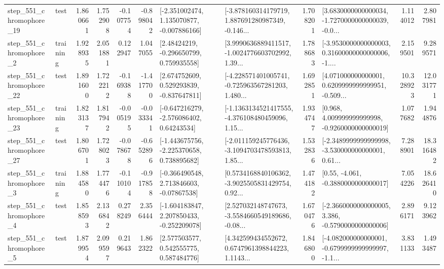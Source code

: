 \begin{tabular}{llrrrrllrlrr}
  step\_551\_chromophore\_19 &      test &      1.860661 &    1.752908 &     -0.107754 & -0.898042 &   [-2.351002474, 1.135070877, -0.007886166] &  [-3.878160314179719, 1.887691280987349, -0.146... &       1.708201 &  [3.6830000000000034, -1.7270000000000039, -0.0... &            1.114012 &          2.807981 \\
   step\_551\_chromophore\_2 &  training &      1.928935 &    2.051881 &      0.122947 &  1.047055 &     [2.48424219, -0.296650799, 0.759935558] &  [3.9990636889411517, -1.0024776603702992, 1.39... &       1.788683 &  [-3.9530000000000003, 0.31600000000000006, -1.... &            2.159501 &          9.289571 \\
  step\_551\_chromophore\_22 &      test &      1.891600 &    1.722212 &     -0.169388 & -1.417700 &    [2.674752609, 0.529293839, -0.837647811] &  [-4.228571401005741, -0.725963567281203, 1.480... &       1.692851 &  [4.071000000000001, 0.6209999999999951, -0.509... &           10.328923 &         12.031771 \\
  step\_551\_chromophore\_23 &  training &      1.823137 &    1.817942 &     -0.005195 & -0.033341 &    [-0.647216279, -2.576086402, 0.64243534] &  [-1.1363134521417555, -4.376108480459096, 1.15... &       1.934747 &    [0.968, 4.009999999999998, -0.9260000000000019] &            1.077682 &          1.944876 \\
  step\_551\_chromophore\_27 &      test &      1.806701 &    1.728023 &     -0.078678 & -0.652896 &   [-1.443675756, -2.225370658, 0.738895682] &  [-2.011159245776436, -3.1094703478593813, 1.85... &       1.532836 &  [-2.3489999999999998, -3.530000000000001, 0.61... &            7.288901 &         18.316482 \\
   step\_551\_chromophore\_3 &  training &      1.884580 &    1.774476 &     -0.110104 & -0.917858 &    [-0.366490548, 2.713846603, -0.07867538] &  [0.5734168840106362, -3.9025505831429754, 0.92... &       1.474182 &                [0.55, -4.061, -0.3880000000000017] &            7.054226 &         18.626410 \\
   step\_551\_chromophore\_4 &      test &      1.858593 &    2.136842 &      0.278249 &  2.356444 &   [-1.604183847, 2.207850433, -0.252209078] &  [2.527032148747673, -3.5584660549189686, -0.08... &       1.670476 &  [-2.3660000000000005, 3.386, -0.5790000000000006] &            2.896171 &          9.123962 \\
   step\_551\_chromophore\_5 &      test &      1.879954 &    2.099597 &      0.219643 &  1.862322 &     [2.577503577, 0.542555775, 0.587484776] &  [4.342599434552672, 0.6747961398844223, 1.1143... &       1.846800 &  [-4.082000000000001, -0.6799999999999997, -1.1... &            3.831133 &          1.493487 \\

\end{tabular}
